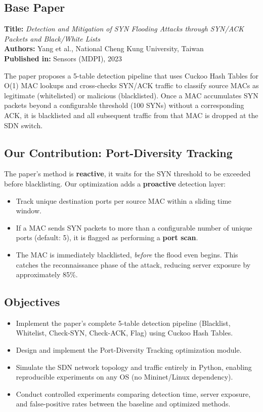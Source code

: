 \documentclass[12pt, a4paper]{article}
\begin{document}
\subsection{Base Paper}

\textbf{Title:} \textit{Detection and Mitigation of SYN Flooding Attacks through SYN/ACK Packets and Black/White Lists}\\
\textbf{Authors:} Yang et al., National Cheng Kung University, Taiwan\\
\textbf{Published in:} Sensors (MDPI), 2023

The paper proposes a 5-table detection pipeline that uses Cuckoo Hash Tables for O(1) MAC lookups and cross-checks SYN/ACK traffic to classify source MACs as legitimate (whitelisted) or malicious (blacklisted). Once a MAC accumulates SYN packets beyond a configurable threshold (100 SYNs) without a corresponding ACK, it is blacklisted and all subsequent traffic from that MAC is dropped at the SDN switch.

\subsection{Our Contribution: Port-Diversity Tracking}

The paper's method is \textbf{reactive}, it waits for the SYN threshold to be exceeded before blacklisting. Our optimization adds a \textbf{proactive} detection layer:

\begin{itemize}[itemsep=3pt]
    \item Track unique destination ports per source MAC within a sliding time window.
    \item If a MAC sends SYN packets to more than a configurable number of unique ports (default: 5), it is flagged as performing a \textbf{port scan}.
    \item The MAC is immediately blacklisted, \textit{before} the flood even begins. This catches the reconnaissance phase of the attack, reducing server exposure by approximately 85\%.

\end{itemize}


\subsection{Objectives}

\begin{itemize}[itemsep=3pt]
    \item Implement the paper's complete 5-table detection pipeline (Blacklist, Whitelist, Check-SYN, Check-ACK, Flag) using Cuckoo Hash Tables.
    \item Design and implement the Port-Diversity Tracking optimization module.
    \item Simulate the SDN network topology and traffic entirely in Python, enabling reproducible experiments on any OS (no Mininet/Linux dependency).
    \item Conduct controlled experiments comparing detection time, server exposure, and false-positive rates between the baseline and optimized methods.
\end{itemize}
\end{document}
